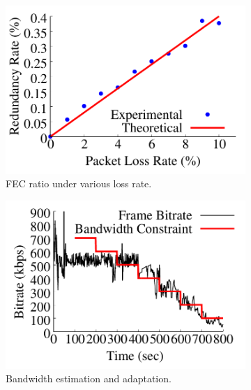 \begin{figure}[ht]
\centering
  \begin{subfigure}[t]{0.33\textwidth}
    \includegraphics[width=\linewidth]{Figs/RTDrive/evaluation/fec_ratio.pdf}
    \vspace{-0.5cm}
    \caption{FEC ratio under various loss rate.}
    \label{fec_ratio}
  \end{subfigure}%
  \begin{subfigure}[t]{0.33\textwidth}
    \includegraphics[width=\linewidth]{Figs/RTDrive/evaluation/bandwidth.pdf}
    \vspace{-0.5cm}
    \caption{Bandwidth estimation and adaptation.}
    \label{bandwidth}
  \end{subfigure}%
  \begin{subfigure}[t]{0.33\textwidth}

\end{subfigure}
\end{figure}
